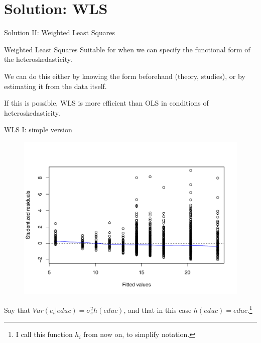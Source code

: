 \documentclass[12pt,english,pdf,xcolor=dvipsnames,aspectratio=169,handout]{beamer}\usepackage[]{graphicx}\usepackage[]{xcolor}
\begin{document}
\section{Solution: WLS}

\begin{frame}
\begin{center}
    \Huge Solution II: Weighted Least Squares
\end{center}
\end{frame}


\begin{frame}{Weighted Least Squares}
  Suitable for when we can specify the functional form of the heteroskedasticity.\bigskip

  We can do this either by knowing the form beforehand (theory, studies), or by estimating it from the data itself.\bigskip

  If this is possible, WLS is more efficient than OLS in conditions of heteroskedasticity.
\end{frame}


\begin{frame}{WLS I: simple version}



\begin{figure}
\centering
\includegraphics[scale=0.45]{../04-graphs/02-05}
\end{figure}

Say that $Var(e_i|educ) = \sigma_e^2h(educ)$, and that in this case $h(educ)=educ$.\footnote{I call this function $h_i$ from now on, to simplify notation.}

\end{frame}
\end{document}

